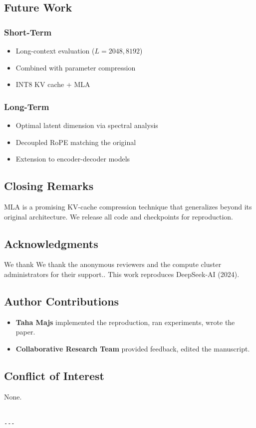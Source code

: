 \subsection{Future Work}

\subsubsection{Short-Term}
\begin{itemize}
\item Long-context evaluation ($L = 2048, 8192$)
\item Combined with parameter compression
\item INT8 KV cache + MLA

\end{itemize}
\subsubsection{Long-Term}
\begin{itemize}
\item Optimal latent dimension via spectral analysis
\item Decoupled RoPE matching the original
\item Extension to encoder-decoder models

\end{itemize}
\subsection{Closing Remarks}

MLA is a promising KV-cache compression technique that generalizes beyond 
its original architecture. We release all code and checkpoints for 
reproduction.

\subsection{Acknowledgments}

We thank We thank the anonymous reviewers and the compute cluster administrators for their support.. This work reproduces DeepSeek-AI (2024).

\subsection{Author Contributions}

\begin{itemize}
\item \textbf{Taha Majs} implemented the reproduction, ran experiments, wrote
  the paper.
\item \textbf{Collaborative Research Team} provided feedback, edited the manuscript.

\end{itemize}
\subsection{Conflict of Interest}

None.
\begin{lstlisting}

---
\end{lstlisting}